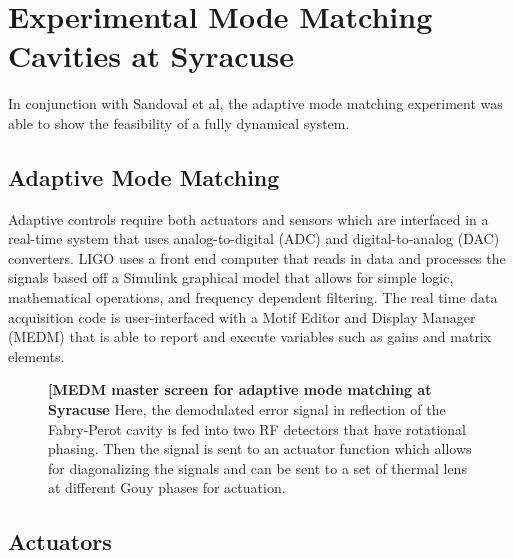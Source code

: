 \chapter{Experimental Mode Matching Cavities at Syracuse}
In conjunction with Sandoval et al, the adaptive mode matching  experiment was able to show the feasibility of a fully dynamical system.
	\section{Adaptive Mode Matching}
	Adaptive controls require both actuators and sensors which are interfaced in a real-time system that uses analog-to-digital (ADC) and digital-to-analog (DAC) converters.  LIGO uses a front end computer that reads in data and processes the signals based off a Simulink graphical model that allows for simple logic, mathematical operations, and frequency dependent filtering.  The real time data acquisition code is user-interfaced with a Motif Editor and Display Manager (MEDM) that is able to report and execute variables such as gains and matrix elements.
	
	\begin{figure}[h]
		\centering
		\caption[MEDM master screen for adaptive mode matching at Syracuse]
		{\textbf{[MEDM master screen for adaptive mode matching at Syracuse} Here, the demodulated error signal in reflection of the Fabry-Perot cavity is fed into two RF detectors that have rotational phasing. Then the signal is sent to an actuator function which allows for diagonalizing the signals and can be sent to a set of thermal lens at different Gouy phases for actuation. }
		\label{fig:AMM_Master}
	\end{figure}
	
	\section{Actuators}
